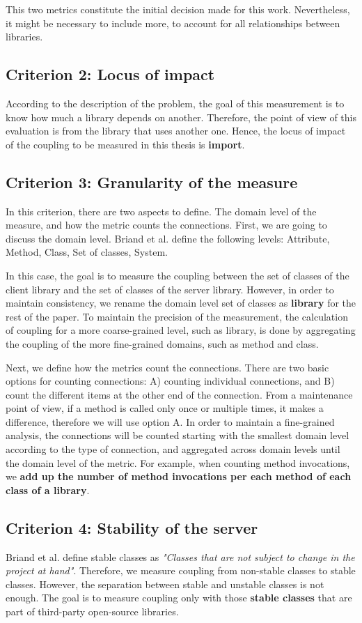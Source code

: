 \documentclass[a4paper]{article}
\begin{document}
This two metrics constitute the initial decision made for this work. Nevertheless, it might be necessary to include more, to account for all relationships between libraries.

\subsection{Criterion 2: Locus of impact}
According to the description of the problem, the goal of this measurement is to know how much a library depends on another. Therefore, the point of view of this evaluation is from the library that uses another one. Hence, the locus of impact of the coupling to be measured in this thesis is \textbf{import}.

\subsection{Criterion 3: Granularity of the measure}
In this criterion, there are two aspects to define. The domain level of the measure, and how the metric counts the connections. First, we are going to discuss the domain level. Briand et al. define the following levels: Attribute, Method, Class, Set of classes, System.

In this case, the goal is to measure the coupling between the set of classes of the client library and the set of classes of the server library. However, in order to maintain consistency, we rename the domain level set of classes as \textbf{library} for the rest of the paper. To maintain the precision of the measurement, the calculation of coupling for a more coarse-grained level, such as library, is done by aggregating the coupling of the more fine-grained domains, such as method and class.

Next, we define how the metrics count the connections. There are two basic options for counting connections: A) counting individual connections, and B) count the different items at the other end of the connection. From a maintenance point of view, if a method is called only once or multiple times, it makes a difference, therefore we will use option A. In order to maintain a fine-grained analysis, the connections will be counted starting with the smallest domain level according to the type of connection, and aggregated across domain levels until the domain level of the metric. For example, when counting method invocations, we  \textbf{add up the number of method invocations per each method of each class of a library}.

\subsection{Criterion 4: Stability of the server}
Briand et al. \cite{briand1999unified} define stable classes as \textit{"Classes that are not subject to change in the project at hand"}. Therefore, we measure coupling from non-stable classes to stable classes.
However, the separation between stable and unstable classes is not enough. The goal is to measure coupling only with those \textbf{stable classes} that are part of third-party open-source libraries.
\end{document}

